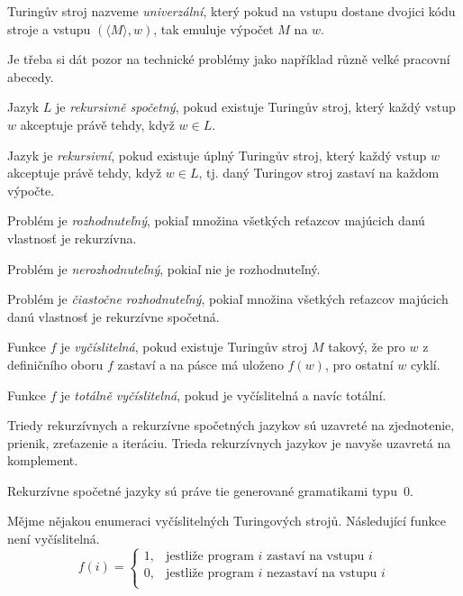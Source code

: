 \begin{definition}[Univerzální TS]
Turingův stroj nazveme {\em univerzální},
který pokud na vstupu dostane dvojici kódu stroje a vstupu
$(\langle M \rangle, w)$, tak emuluje výpočet $M$ na $w$.
\end{definition}

Je třeba si dát pozor na technické problémy jako například různě velké
pracovní abecedy.

\begin{definition}
    Jazyk $L$ je {\em rekursivně spočetný}, pokud existuje Turingův
    stroj, který každý vstup $w$ akceptuje právě tehdy, když $w \in L$.

    Jazyk je {\em rekursivní}, pokud existuje úplný Turingův
    stroj, který každý vstup $w$ akceptuje právě tehdy, když $w \in L$,
	tj. daný Turingov stroj zastaví na každom výpočte.

	Problém je {\em rozhodnuteľný}, pokiaľ množina všetkých reťazcov
	majúcich danú vlastnosť je rekurzívna.
	
	Problém je {\em nerozhodnuteľný}, pokiaľ nie je rozhodnuteľný.
	
	Problém je {\em čiastočne rozhodnuteľný}, pokiaľ množina všetkých reťazcov
	majúcich danú vlastnosť je rekurzívne spočetná.

    Funkce $f$ je {\em vyčíslitelná}, pokud existuje Turingův
    stroj $M$ takový, že pro $w$ z definičního oboru $f$ zastaví a na pásce má
    uloženo $f(w)$, pro ostatní $w$ cyklí.

    Funkce $f$ je {\em totálně vyčíslitelná}, pokud je vyčíslitelná a
    navíc totální.
\end{definition}

Triedy rekurzívnych a rekurzívne spočetných jazykov sú uzavreté na 
zjednotenie, prienik, zreťazenie a iteráciu. Trieda rekurzívnych
jazykov je navyše uzavretá na komplement.

Rekurzívne spočetné jazyky sú práve tie generované gramatikami typu~$0$.

\begin{theorem}
Mějme nějakou enumeraci vyčíslitelných Turingových strojů.
Následující funkce není vyčíslitelná.
\[
    f(i) =
    \begin{cases}
        1, & \text{jestliže program } i \text { zastaví na vstupu } i \\
        0, & \text{jestliže program } i \text { nezastaví na vstupu } i \\
    \end{cases}
\]
\end{theorem}

